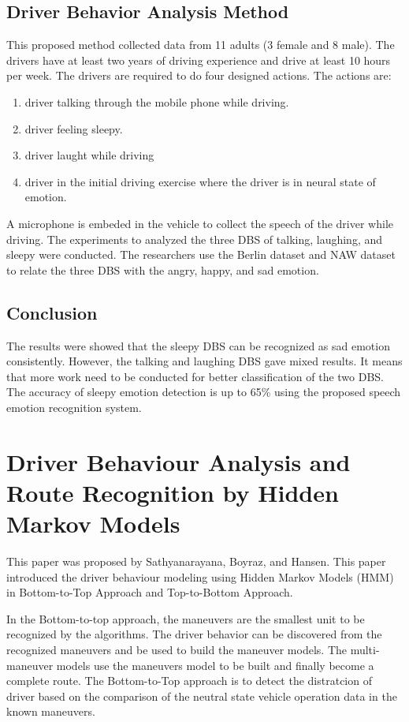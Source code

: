 \subsection{Driver Behavior Analysis Method}
This proposed method collected data from 11 adults (3 female and 8 male). The drivers have at least two years of driving experience and drive at least 10 hours per week. The drivers are required to do four designed actions. The actions are: 
\begin{enumerate}
\item driver talking through the mobile phone while driving.
\item driver feeling sleepy.
\item driver laught while driving
\item driver in the initial driving exercise where the driver is in neural state of emotion.
\end{enumerate}

A microphone is embeded in the vehicle to collect the speech of the driver while driving. The experiments to analyzed the three DBS of talking, laughing, and sleepy were conducted. The researchers use the Berlin dataset and NAW dataset to relate the three DBS with the angry, happy, and sad emotion.

\subsection{Conclusion}
The results were showed that the sleepy DBS can be recognized as sad emotion consistently. However, the talking and laughing DBS gave mixed results. It means that more work need to be conducted for better classification of the two DBS. The accuracy of sleepy emotion detection is up to 65\% using the proposed speech emotion recognition system.


\section{Driver Behaviour Analysis and Route Recognition by Hidden Markov Models}
This paper was proposed by Sathyanarayana, Boyraz, and Hansen\citeyear{sath:2008}. This paper introduced the driver behaviour modeling using Hidden Markov Models (HMM) in Bottom-to-Top Approach and Top-to-Bottom Approach.

In the Bottom-to-top approach, the maneuvers are the smallest unit to be recognized by the algorithms. The driver behavior can be discovered from the recognized maneuvers and be used to build the maneuver models. The multi-maneuver models use the maneuvers model to be built and finally become a complete route. The Bottom-to-Top approach is to detect the distratcion of driver based on the comparison of the neutral state vehicle operation data in the known maneuvers.

